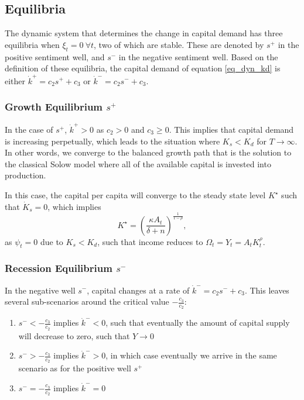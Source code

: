 \documentclass[11pt]{article}
\begin{document}
\subsection{Equilibria}
The dynamic system that determines the change in capital demand has three equilibria when $\xi_t=0~\forall t$, two of which are stable. These are denoted by $s^{+}$ in the positive sentiment well, and $s^{-}$ in the negative sentiment well. Based on the definition of these equilibria, the capital demand of equation \eqref{eq_dyn_kd} is either $\dot{k}^{+} = c_2s^{+} + c_3                                                                                                                                                                                                                                                                       $ or $\dot{k}^{-} = c_2s^{-}+c_3$.

\subsubsection{Growth Equilibrium $s^{+}$}
In the case of $s^{+}$, $\dot{k}^{+}>0$ as $c_2>0$ and $c_3\geq0$. This implies that capital demand is increasing perpetually, which leads to the situation where $K_s<K_d$ for $T\rightarrow\infty$. In other words,  we converge to the balanced growth path that is the solution to the classical Solow model where all of the available capital is invested into production.

In this case, the capital per capita will converge to the steady state level $K^{\star}$ such that $\dot{K}_s=0$, which implies
\begin{equation}\label{eq_steady_k}
K^{\star} = \left(\frac{\kappa A_t}{\delta + n}\right)^{\frac{1}{1-\rho}},
\end{equation}
as $\psi_t=0$ due to $K_s<K_d$, such that income reduces to $\Omega_t=Y_t=A_tK_t^{\rho}$.

\subsubsection{Recession Equilibrium $s^{-}$}
In the negative well $s^{-}$, capital changes at a rate of $\dot{k}^{-} = c_2 s^{-} + c_3$. This leaves several sub-scenarios around the critical value $-\frac{c_3}{c_2}$:
\begin{enumerate}
\item $s^{-} < -\frac{c_3}{c_2}$ implies $\dot{k}^{-}<0$, such that eventually the amount of capital supply will decrease to zero, such that $Y\rightarrow0$
\item $s^{-} > -\frac{c_3}{c_2}$ implies $\dot{k}^{-}>0$, in which case eventually we arrive in the same scenario as for the positive well $s^{+}$
\item $s^{-} = -\frac{c_3}{c_2}$ implies $\dot{k}^{-}=0$
\end{enumerate} 
\end{document}

